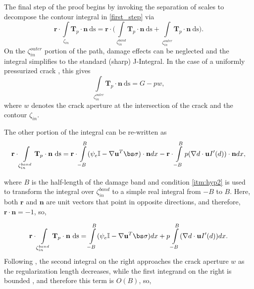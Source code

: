 The final step of the proof begins by invoking the separation of scales to decompose the contour integral in \eqref{first_step} via
\begin{equation}\label{step3}
    \textbf{r}\cdot\int\limits_{\zeta_{in}}\textbf{T}_p\cdot\textbf{n}\ \text{ds} = \textbf{r}\cdot\biggl(\int\limits_{\zeta^{band}_{in}}\textbf{T}_p\cdot\textbf{n}\ \text{ds} + \int\limits_{\zeta^{outer}_{in}}\textbf{T}_p\cdot\textbf{n}\ \text{ds} \biggr).
\end{equation}
On the $\zeta^{outer}_{in}$ portion of the path, damage effects can be neglected and the integral simplifies to the standard (sharp) J-Integral.  In the case of a uniformly pressurized crack \cite{karlsson1978jintegral}, this gives
\begin{equation}\label{path_outer}
    \int\limits_{\zeta^{outer}_{in}}\textbf{T}_p\cdot\textbf{n}\ \text{ds} = G - pw,
\end{equation}
where $w$ denotes the crack aperture at the intersection of the crack and the contour $\zeta_{in}$. 

The other portion of the integral can be re-written as
\begin{equation}
    \textbf{r}\cdot \int\limits_{\zeta^{band}_{in}}\textbf{T}_p\cdot\textbf{n}\ \text{ds} = \textbf{r}\cdot\int\limits_{-B}^{B}(\psi_e\mathbb{I}-\nabla \textbf{u}^T\bs\sigma)\cdot\textbf{n}dx - \textbf{r}\cdot\int\limits_{-B}^{B}p(\nabla d\cdot \textbf{u}I'(d))\cdot\textbf{n}dx,
\end{equation}

\noindent where $B$ is the half-length of the damage band and condition \ref{itm:hyp2} is used to transform the integral over $\zeta^{band}_{in}$ to a simple real integral from $-B$ to $B$. Here, both $\textbf{r}$ and $\textbf{n}$ are unit vectors that point in opposite directions, and therefore, $\textbf{r}\cdot\textbf{n}=-1$, so,

\begin{equation}
    \textbf{r}\cdot \int\limits_{\zeta^{band}_{in}}\textbf{T}_p\cdot\textbf{n}\ \text{ds} = \int\limits_{-B}^{B}(\psi_e\mathbb{I}-\nabla \textbf{u}^T\bs\sigma)dx + p\int\limits_{-B}^{B}(\nabla d\cdot \textbf{u}I'(d))dx.
\end{equation}
Following \cite{bourdin2012variational}, the second integral on the right approaches the crack aperture $w$ as the regularization length decreases, while the first integrand on the right is bounded \cite{sicsic2013gradient}, and therefore this term is $O(B)$, so,

